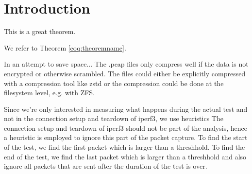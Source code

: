 
\chapter{Introduction}


\begin{theorem}[Test][theoremname]
  This is a great theorem.
\end{theorem}

We refer to Theorem \ref{coq:theoremname}.

In an attempt to save space...
The .pcap files only compress well if the data is not encrypted or otherwise scrambled.
The files could either be explicitly compressed with a compression tool like zstd or the compression could be done at the filesystem level, e.g. with ZFS.


Since we're only interested in measuring what happens during the actual test and not in the connection setup and teardown of iperf3, we use heuristics
The connection setup and teardown of iperf3 should not be part of the analysis, hence a heuristic is employed to ignore this part of the packet capture. To find the start of the test, we find the first packet which is larger than a threshhold. To find the end of the test, we find the last packet which is larger than a threshhold and also ignore all packets that are sent after the duration of the test is over.

